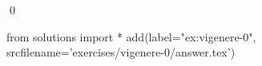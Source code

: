 
\begin{ex} 
  \label{ex:vigenere-0}
  
  \qed
\end{ex} 
\begin{python0}
from solutions import *
add(label="ex:vigenere-0",
    srcfilename='exercises/vigenere-0/answer.tex') 
\end{python0}
